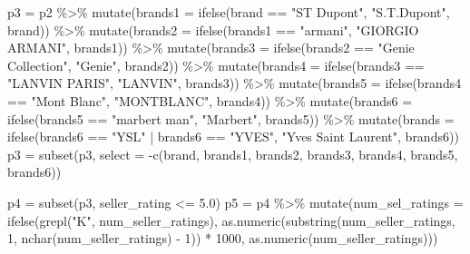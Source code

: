 \documentclass[
]{article}
\newenvironment{Shaded}{\begin{snugshade}}{\end{snugshade}}
\newcommand{\AttributeTok}[1]{\textcolor[rgb]{0.77,0.63,0.00}{#1}}
\newcommand{\DecValTok}[1]{\textcolor[rgb]{0.00,0.00,0.81}{#1}}
\newcommand{\FloatTok}[1]{\textcolor[rgb]{0.00,0.00,0.81}{#1}}
\newcommand{\FunctionTok}[1]{\textcolor[rgb]{0.00,0.00,0.00}{#1}}
\newcommand{\NormalTok}[1]{#1}
\newcommand{\OtherTok}[1]{\textcolor[rgb]{0.56,0.35,0.01}{#1}}
\newcommand{\SpecialCharTok}[1]{\textcolor[rgb]{0.00,0.00,0.00}{#1}}
\newcommand{\StringTok}[1]{\textcolor[rgb]{0.31,0.60,0.02}{#1}}
\begin{document}
\begin{Shaded}
\begin{Highlighting}[]
\NormalTok{p3 }\OtherTok{=}\NormalTok{ p2 }\SpecialCharTok{\%\textgreater{}\%}
  \FunctionTok{mutate}\NormalTok{(}\AttributeTok{brands1 =} \FunctionTok{ifelse}\NormalTok{(brand }\SpecialCharTok{==} \StringTok{"ST Dupont"}\NormalTok{, }\StringTok{"S.T.Dupont"}\NormalTok{, brand)) }\SpecialCharTok{\%\textgreater{}\%}
  \FunctionTok{mutate}\NormalTok{(}\AttributeTok{brands2 =} \FunctionTok{ifelse}\NormalTok{(brands1 }\SpecialCharTok{==} \StringTok{"armani"}\NormalTok{, }\StringTok{"GIORGIO ARMANI"}\NormalTok{, brands1)) }\SpecialCharTok{\%\textgreater{}\%}
  \FunctionTok{mutate}\NormalTok{(}\AttributeTok{brands3 =} \FunctionTok{ifelse}\NormalTok{(brands2 }\SpecialCharTok{==} \StringTok{"Genie Collection"}\NormalTok{, }\StringTok{"Genie"}\NormalTok{, brands2)) }\SpecialCharTok{\%\textgreater{}\%}
  \FunctionTok{mutate}\NormalTok{(}\AttributeTok{brands4 =} \FunctionTok{ifelse}\NormalTok{(brands3 }\SpecialCharTok{==} \StringTok{"LANVIN PARIS"}\NormalTok{, }\StringTok{"LANVIN"}\NormalTok{, brands3)) }\SpecialCharTok{\%\textgreater{}\%}
  \FunctionTok{mutate}\NormalTok{(}\AttributeTok{brands5 =} \FunctionTok{ifelse}\NormalTok{(brands4 }\SpecialCharTok{==} \StringTok{"Mont Blanc"}\NormalTok{, }\StringTok{"MONTBLANC"}\NormalTok{, brands4)) }\SpecialCharTok{\%\textgreater{}\%}
  \FunctionTok{mutate}\NormalTok{(}\AttributeTok{brands6 =} \FunctionTok{ifelse}\NormalTok{(brands5 }\SpecialCharTok{==} \StringTok{"marbert man"}\NormalTok{, }\StringTok{"Marbert"}\NormalTok{, brands5)) }\SpecialCharTok{\%\textgreater{}\%}
  \FunctionTok{mutate}\NormalTok{(}\AttributeTok{brands =} \FunctionTok{ifelse}\NormalTok{(brands6 }\SpecialCharTok{==} \StringTok{"YSL"} \SpecialCharTok{|}\NormalTok{ brands6 }\SpecialCharTok{==} \StringTok{"YVES"}\NormalTok{, }\StringTok{"Yves Saint Laurent"}\NormalTok{, brands6))}
\NormalTok{p3 }\OtherTok{=} \FunctionTok{subset}\NormalTok{(p3, }\AttributeTok{select =} \SpecialCharTok{{-}}\FunctionTok{c}\NormalTok{(brand, brands1, brands2, brands3, brands4, brands5, brands6))}
\end{Highlighting}
\end{Shaded}

\begin{Shaded}
\begin{Highlighting}[]
\NormalTok{p4 }\OtherTok{=} \FunctionTok{subset}\NormalTok{(p3, seller\_rating }\SpecialCharTok{\textless{}=} \FloatTok{5.0}\NormalTok{)}
\NormalTok{p5 }\OtherTok{=}\NormalTok{ p4 }\SpecialCharTok{\%\textgreater{}\%}
  \FunctionTok{mutate}\NormalTok{(}\AttributeTok{num\_sel\_ratings =} 
           \FunctionTok{ifelse}\NormalTok{(}\FunctionTok{grepl}\NormalTok{(}\StringTok{"K"}\NormalTok{, num\_seller\_ratings), }
                  \FunctionTok{as.numeric}\NormalTok{(}\FunctionTok{substring}\NormalTok{(num\_seller\_ratings, }\DecValTok{1}\NormalTok{, }\FunctionTok{nchar}\NormalTok{(num\_seller\_ratings) }\SpecialCharTok{{-}} \DecValTok{1}\NormalTok{)) }\SpecialCharTok{*} \DecValTok{1000}\NormalTok{,}
                  \FunctionTok{as.numeric}\NormalTok{(num\_seller\_ratings)))}
\end{Highlighting}
\end{Shaded}
\end{document}
